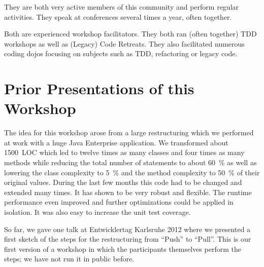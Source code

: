 \documentclass[a4,11pt]{article}
\begin{document}
They are both very active members of this community and perform regular activities. They speak at conferences several times a year, often together.

Both are experienced workshop facilitators. They both ran (often together) TDD workshops as well as (Legacy) Code Retreats. They also facilitated numerous coding dojos focusing on subjects such as TDD, refactoring or legacy code.

\section*{Prior Presentations of this Workshop}

The idea for this workshop arose from a large restructuring which we performed at work with a huge Java Enterprise application. We transformed about 1500~LOC which led to twelve times as many classes and four times as many methods while reducing the total number of statements to about 60~\% as well as lowering the class complexity to  5~\% and the method complexity to 50~\% of their original values.
During the last few months this code had to be changed and extended many times. It has shown to be very robust and flexible. 
The runtime performance even improved and further optimizations could be applied in isolation. It was also easy to increase the unit test coverage.

So far, we gave one talk at Entwicklertag Karlsruhe 2012 where we presented a first sketch of the steps for the restructuring from ``Push'' to ``Pull''. This is our first version of a workshop in which the participants themselves perform the steps; we have not run it in public before.
\end{document}
